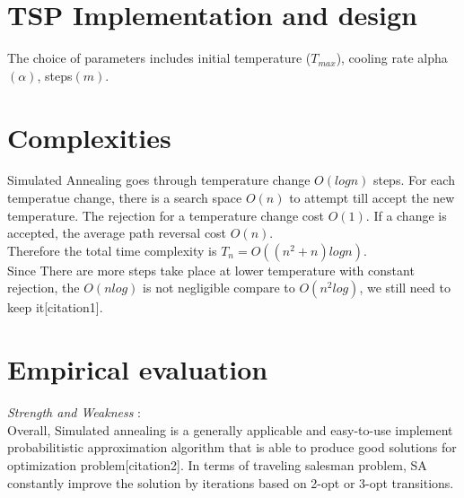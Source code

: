 \documentclass[12pt]{article}
\begin{document}
\section{TSP Implementation and design}
The choice of parameters includes initial temperature ($T_{max}$), cooling rate alpha$(\alpha)$, steps$(m)$. 



\section{Complexities}
Simulated Annealing goes through temperature change $O(logn)$ steps. For each temperatue change, there is a search space $O(n)$ to attempt till accept the new temperature. The rejection for a temperature change cost $O(1)$. If a change is accepted, the average path reversal cost $O(n)$. \\

Therefore the total time complexity is $T_n = O((n^2 + n) log n)$. \\

Since There are more steps take place at lower temperature with constant rejection, the $O(nlog)$ is not negligible compare to $O(n^2log)$, we still need to keep it[citation1]. 



\section{Empirical evaluation}
\textit{Strength and Weakness} : \\
Overall, Simulated annealing is a generally applicable and easy-to-use implement probabilitistic approximation algorithm that is able to produce good solutions for optimization problem[citation2]. In terms of traveling salesman problem, SA constantly improve the solution by iterations based on 2-opt or 3-opt transitions. 
\end{document}
